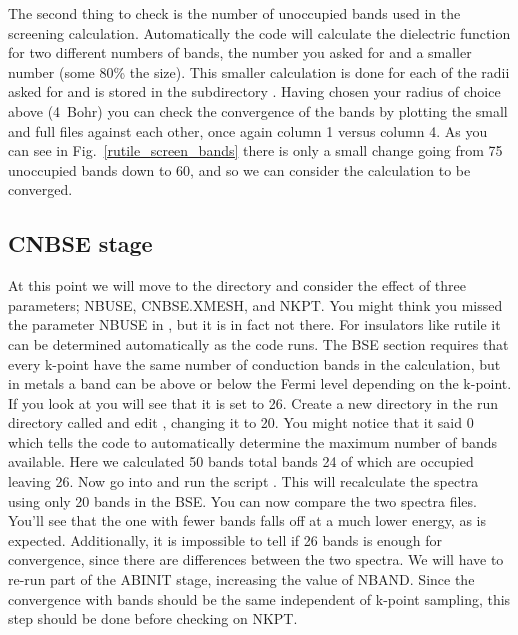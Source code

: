 \documentclass[11pt]{report}
\begin{document}
The second thing to check is the number of unoccupied bands used in the screening calculation. Automatically the code will calculate the dielectric function for two different numbers of bands, the number you asked for and a smaller number (some 80\% the size). This smaller calculation is done for each of the radii asked for and is stored in the subdirectory . Having chosen your radius of choice above (4~Bohr) you can check the convergence of the bands by plotting the small and full  files against each other, once again column 1 versus column 4. As you can see in Fig.\ \ref{rutile_screen_bands} there is only a small change going from 75 unoccupied bands down to 60, and so we can consider the calculation to be converged.



\subsection{CNBSE stage}

At this point we will move to the  directory and consider the effect of three parameters; NBUSE, CNBSE.XMESH, and NKPT. You might think you missed the parameter NBUSE in , but it is in fact not there. For insulators like rutile it can be determined automatically as the code runs. The BSE section requires that every k-point have the same number of conduction bands in the calculation, but in metals a band can be above or below the Fermi level depending on the k-point. If you look at  you will see that it is set to 26. Create a new directory in the run directory called  and edit , changing it to 20. You might notice that it said 0 which tells the code to automatically determine the maximum number of bands available. Here we calculated 50 bands total bands 24 of which are occupied leaving 26. Now go into  and run the script . This will recalculate the spectra using only 20 bands in the BSE. You can now compare the two spectra files. You'll see that the one with fewer bands falls off at a much lower energy, as is expected. Additionally, it is impossible to tell if 26 bands is enough for convergence, since there are differences between the two spectra. We will have to re-run part of the ABINIT stage, increasing the value of NBAND. Since the convergence with bands should be the same independent of k-point sampling, this step should be done before checking on NKPT.
\end{document}
